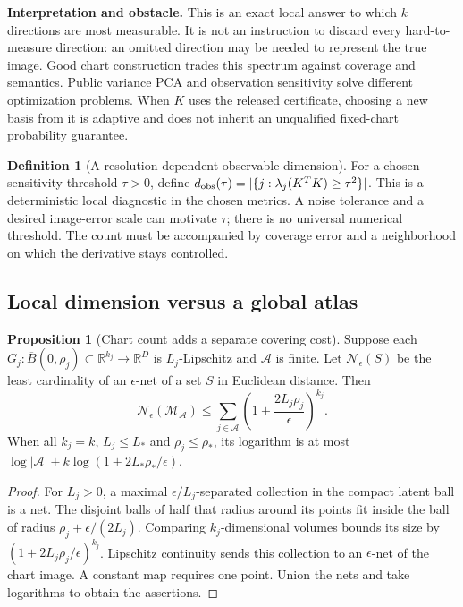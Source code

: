 \documentclass[11pt,a4paper]{article}
\theoremstyle{definition}
\newtheorem{proposition}[theorem]{Proposition}
\theoremstyle{definition}
\newtheorem{definition}[theorem]{Definition}
\theoremstyle{remark}\newtheorem{remark}[theorem]{Remark}
\newcommand{\R}{\mathbb R}\newcommand{\Prob}{\mathbb P}\newcommand{\E}{\mathbb E}
\begin{document}
\textbf{Interpretation and obstacle.} This is an exact local answer to which $k$ directions are most measurable. It is not an instruction to discard every hard-to-measure direction: an omitted direction may be needed to represent the true image. Good chart construction trades this spectrum against coverage and semantics. Public variance PCA and observation sensitivity solve different optimization problems. When $K$ uses the released certificate, choosing a new basis from it is adaptive and does not inherit an unqualified fixed-chart probability guarantee.

\begin{definition}[A resolution-dependent observable dimension]
For a chosen sensitivity threshold $\tau>0$, define
$d_{\rm obs}(\tau)=|\{j:\lambda_j(K^TK)\ge\tau^2\}|$.
This is a deterministic local diagnostic in the chosen metrics. A noise tolerance and a desired image-error scale can motivate $\tau$; there is no universal numerical threshold. The count must be accompanied by coverage error and a neighborhood on which the derivative stays controlled.
\end{definition}

\subsection{Local dimension versus a global atlas}

\begin{proposition}[Chart count adds a separate covering cost]\label{prop:atlascover}
Suppose each $G_j:\overline B(0,\rho_j)\subset\R^{k_j}\to\R^D$ is $L_j$-Lipschitz and $\mathcal A$ is finite. Let $\mathcal N_\epsilon(S)$ be the least cardinality of an $\epsilon$-net of a set $S$ in Euclidean distance. Then
\[
\mathcal N_\epsilon(\mathcal M_{\mathcal A})
\le\sum_{j\in\mathcal A}\left(1+\frac{2L_j\rho_j}{\epsilon}\right)^{k_j}.
\]
When all $k_j=k$, $L_j\le L_*$ and $\rho_j\le\rho_*$, its logarithm is at most
$\log|\mathcal A|+k\log(1+2L_*\rho_*/\epsilon)$.
\end{proposition}
\begin{proof}
For $L_j>0$, a maximal $\epsilon/L_j$-separated collection in the compact latent ball is a net. The disjoint balls of half that radius around its points fit inside the ball of radius $\rho_j+\epsilon/(2L_j)$. Comparing $k_j$-dimensional volumes bounds its size by $(1+2L_j\rho_j/\epsilon)^{k_j}$. Lipschitz continuity sends this collection to an $\epsilon$-net of the chart image. A constant map requires one point. Union the nets and take logarithms to obtain the assertions.
\end{proof}
\end{document}
